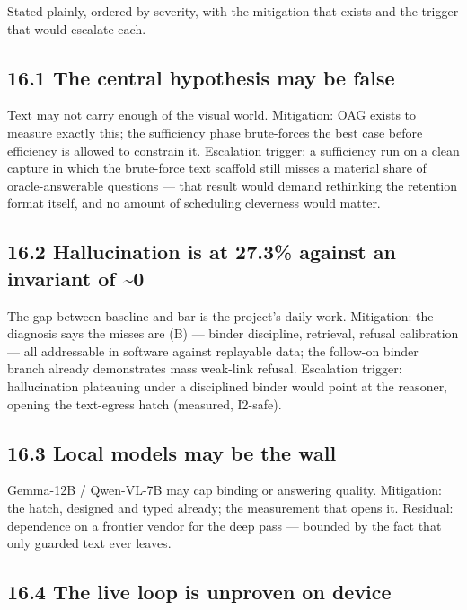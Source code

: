 Stated plainly, ordered by severity, with the mitigation that exists and the trigger that would escalate each.

\subsection{16.1 The central hypothesis may be false}\label{the-central-hypothesis-may-be-false}

Text may not carry enough of the visual world. Mitigation: OAG exists to measure exactly this; the sufficiency phase brute-forces the best case before efficiency is allowed to constrain it. Escalation trigger: a sufficiency run on a clean capture in which the brute-force text scaffold still misses a material share of oracle-answerable questions --- that result would demand rethinking the retention format itself, and no amount of scheduling cleverness would matter.

\subsection{16.2 Hallucination is at 27.3\% against an invariant of \textasciitilde0}\label{hallucination-is-at-27.3-against-an-invariant-of-0}

The gap between baseline and bar is the project's daily work. Mitigation: the diagnosis says the misses are (B) --- binder discipline, retrieval, refusal calibration --- all addressable in software against replayable data; the follow-on binder branch already demonstrates mass weak-link refusal. Escalation trigger: hallucination plateauing under a disciplined binder would point at the reasoner, opening the text-egress hatch (measured, I2-safe).

\subsection{16.3 Local models may be the wall}\label{local-models-may-be-the-wall}

Gemma-12B / Qwen-VL-7B may cap binding or answering quality. Mitigation: the hatch, designed and typed already; the measurement that opens it. Residual: dependence on a frontier vendor for the deep pass --- bounded by the fact that only guarded text ever leaves.

\subsection{16.4 The live loop is unproven on device}\label{the-live-loop-is-unproven-on-device}

